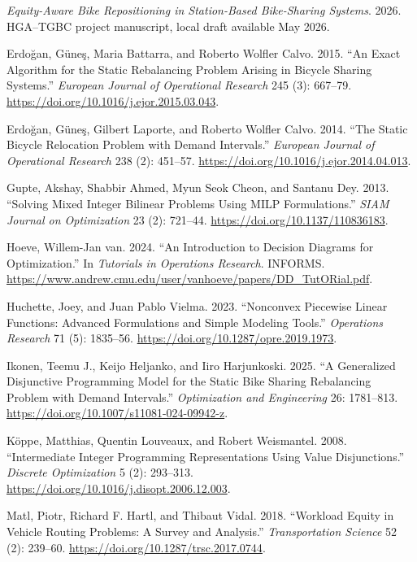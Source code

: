 \documentclass[
  american,
  11pt,
]{article}
\newlength{\cslhangindent}
\newenvironment{CSLReferences}[2] %
 {\begin{list}{}{%
  \setlength{\itemindent}{0pt}
  \setlength{\leftmargin}{0pt}
  \setlength{\parsep}{0pt}
  \ifodd #1
   \setlength{\leftmargin}{\cslhangindent}
   \setlength{\itemindent}{-1\cslhangindent}
  \fi
  \setlength{\itemsep}{#2\baselineskip}}}
 {\end{list}}
\begin{document}
\begin{CSLReferences}{1}{1}
\emph{Equity-Aware Bike Repositioning in Station-Based Bike-Sharing
Systems}. 2026. HGA--TGBC project manuscript, local draft available May
2026.

Erdoğan, Güneş, Maria Battarra, and Roberto Wolfler Calvo. 2015. {``An
Exact Algorithm for the Static Rebalancing Problem Arising in Bicycle
Sharing Systems.''} \emph{European Journal of Operational Research} 245
(3): 667--79. \url{https://doi.org/10.1016/j.ejor.2015.03.043}.

Erdoğan, Güneş, Gilbert Laporte, and Roberto Wolfler Calvo. 2014. {``The
Static Bicycle Relocation Problem with Demand Intervals.''}
\emph{European Journal of Operational Research} 238 (2): 451--57.
\url{https://doi.org/10.1016/j.ejor.2014.04.013}.

Gupte, Akshay, Shabbir Ahmed, Myun Seok Cheon, and Santanu Dey. 2013.
{``Solving Mixed Integer Bilinear Problems Using MILP Formulations.''}
\emph{SIAM Journal on Optimization} 23 (2): 721--44.
\url{https://doi.org/10.1137/110836183}.

Hoeve, Willem-Jan van. 2024. {``An Introduction to Decision Diagrams for
Optimization.''} In \emph{Tutorials in Operations Research}. INFORMS.
\url{https://www.andrew.cmu.edu/user/vanhoeve/papers/DD_TutORial.pdf}.

Huchette, Joey, and Juan Pablo Vielma. 2023. {``Nonconvex Piecewise
Linear Functions: Advanced Formulations and Simple Modeling Tools.''}
\emph{Operations Research} 71 (5): 1835--56.
\url{https://doi.org/10.1287/opre.2019.1973}.

Ikonen, Teemu J., Keijo Heljanko, and Iiro Harjunkoski. 2025. {``A
Generalized Disjunctive Programming Model for the Static Bike Sharing
Rebalancing Problem with Demand Intervals.''} \emph{Optimization and
Engineering} 26: 1781--813.
\url{https://doi.org/10.1007/s11081-024-09942-z}.

Köppe, Matthias, Quentin Louveaux, and Robert Weismantel. 2008.
{``Intermediate Integer Programming Representations Using Value
Disjunctions.''} \emph{Discrete Optimization} 5 (2): 293--313.
\url{https://doi.org/10.1016/j.disopt.2006.12.003}.

Matl, Piotr, Richard F. Hartl, and Thibaut Vidal. 2018. {``Workload
Equity in Vehicle Routing Problems: A Survey and Analysis.''}
\emph{Transportation Science} 52 (2): 239--60.
\url{https://doi.org/10.1287/trsc.2017.0744}.


\end{CSLReferences}
\end{document}
